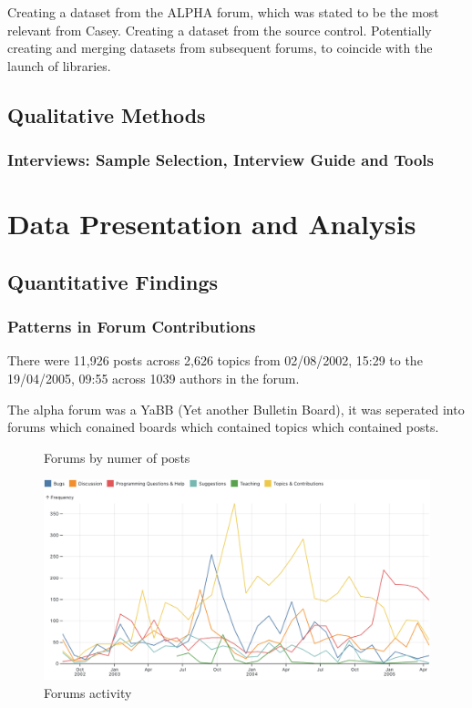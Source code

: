 \documentclass{article}
\begin{document}
Creating a dataset from the ALPHA forum, which was stated to be the most relevant from Casey.
Creating a dataset from the source control.
Potentially creating and merging datasets from subsequent forums, to coincide with the launch of libraries.

\subsection{Qualitative Methods}
\subsubsection{Interviews: Sample Selection, Interview Guide and Tools}


\section{Data Presentation and Analysis}

\subsection{Quantitative Findings}

\subsubsection{Patterns in Forum Contributions}
There were 11,926 posts across 2,626 topics from 02/08/2002, 15:29 to the 19/04/2005, 09:55 across 1039 authors in the forum.

The alpha forum was a YaBB (Yet another Bulletin Board), it was seperated into forums which conained boards which contained topics which contained posts.

\begin{figure}[h!] 
  \centering 
  
  \caption{Forums by numer of posts}
  \label{fig:forums}  
\end{figure}

\begin{figure}[htbp] 
  \centering
  \includegraphics[width=1\textwidth]{alpha-forums-activity.png} 
  \caption{Forums activity}
  \label{fig:forum-activity}  
\end{figure}
\end{document}
